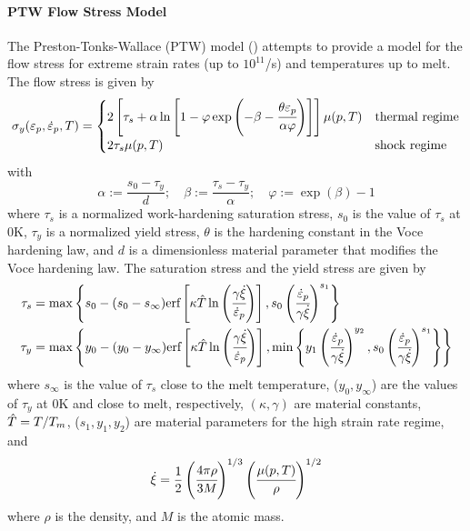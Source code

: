   \paragraph{PTW Flow Stress Model}
  The Preston-Tonks-Wallace (PTW) model (\cite{Preston2003}) attempts to 
  provide a model for the flow stress for extreme strain rates 
  (up to $10^{11}$/s) and temperatures up to melt.  The flow stress is
  given by
  \begin{equation}
    \sigma_y(\varepsilon_p,\dot{\varepsilon}_{p},T) = 
       \begin{cases}
         2\left[\tau_s + \alpha\ln\left[1 - \varphi
          \exp\left(-\beta-\cfrac{\theta\varepsilon_p}{\alpha\varphi}\right)\right]\right]
         \mu(p,T) & \text{thermal regime} \\
         2\tau_s\mu(p,T) & \text{shock regime}
       \end{cases}
  \end{equation}
  with 
  \begin{equation}
    \alpha := \frac{s_0 - \tau_y}{d}; \quad
    \beta := \frac{\tau_s - \tau_y}{\alpha}; \quad
    \varphi := \exp(\beta) - 1
  \end{equation}
  where $\tau_s$ is a normalized work-hardening saturation stress,
  $s_0$ is the value of $\tau_s$ at 0K,
  $\tau_y$ is a normalized yield stress, $\theta$ is the hardening constant
  in the Voce hardening law, and $d$ is a dimensionless material
  parameter that modifies the Voce hardening law.  The saturation stress
  and the yield stress are given by
  \begin{align}
    \tau_s & = \max\left\{s_0 - (s_0 - s_{\infty})
       \text{erf}\left[\kappa
         \hat{T}\ln\left(\cfrac{\gamma\dot{\xi}}{\dot{\varepsilon}_{p}}\right)\right],
       s_0\left(\cfrac{\dot{\varepsilon}_{p}}{\gamma\dot{\xi}}\right)^{s_1}\right\} \\
    \tau_y & = \max\left\{y_0 - (y_0 - y_{\infty})
       \text{erf}\left[\kappa
         \hat{T}\ln\left(\cfrac{\gamma\dot{\xi}}{\dot{\varepsilon}_{p}}\right)\right],
       \min\left\{
         y_1\left(\cfrac{\dot{\varepsilon}_{p}}{\gamma\dot{\xi}}\right)^{y_2}, 
         s_0\left(\cfrac{\dot{\varepsilon}_{p}}{\gamma\dot{\xi}}\right)^{s_1}\right\}\right\} 
  \end{align}
  where $s_{\infty}$ is the value of $\tau_s$ close to the melt temperature,
  ($y_0, y_{\infty}$) are the values of $\tau_y$ at 0K and close to melt,
  respectively, $(\kappa, \gamma)$ are material constants, $\hat{T} = T/T_m$,
  ($s_1, y_1, y_2$) are material parameters for the high strain rate
  regime, and
  \begin{equation}
    \dot{\xi} = \frac{1}{2}\left(\cfrac{4\pi\rho}{3M}\right)^{1/3}
             \left(\cfrac{\mu(p,T)}{\rho}\right)^{1/2}
  \end{equation}
  where $\rho$ is the density, and $M$ is the atomic mass.


